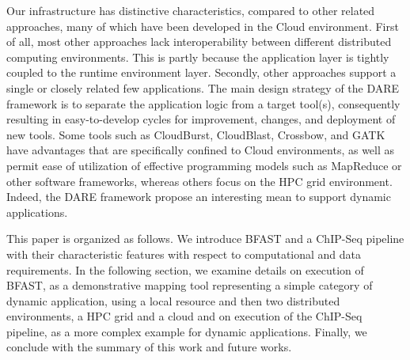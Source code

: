 \documentclass{cpeauth}
\begin{document}
Our infrastructure has distinctive characteristics, compared to other
related approaches\cite{taylor2010,cloudburst, cloudblast,
  langmead2009,langmead2010,gatk,halligan2009,luyf-2010}, many of
which have been developed in the Cloud environment.  First of all,
most other approaches lack interoperability between different
distributed computing environments.  This is partly because the
application layer is tightly coupled to the runtime environment layer.
Secondly, other approaches support a single or closely related few
applications.  The main design strategy of the DARE framework is to
separate the application logic from a target tool(s), consequently
resulting in easy-to-develop cycles for improvement, changes, and
deployment of new tools.  %
Some tools such as CloudBurst\cite{cloudburst},
CloudBlast\cite{cloudblast}, Crossbow\cite{langmead2009}, and
GATK\cite{gatk} have advantages that are specifically confined to
Cloud environments, as well as permit ease of utilization of effective
programming models such as MapReduce or other software frameworks,
whereas others\cite{luyf-2010} focus on the HPC grid environment.  Indeed, the DARE framework propose an interesting mean to support dynamic applications.

This paper is organized as follows.  We introduce BFAST and a ChIP-Seq pipeline with
their characteristic features with respect to computational and data
requirements.  In the following section, we examine
details on execution of BFAST, as a demonstrative mapping tool representing a simple category of dynamic application, using a local resource and then two distributed environments, a HPC grid and a cloud and on execution of the ChIP-Seq pipeline, as a more complex example for dynamic applications. Finally, we conclude with the summary of this work and future works.




\end{document}
